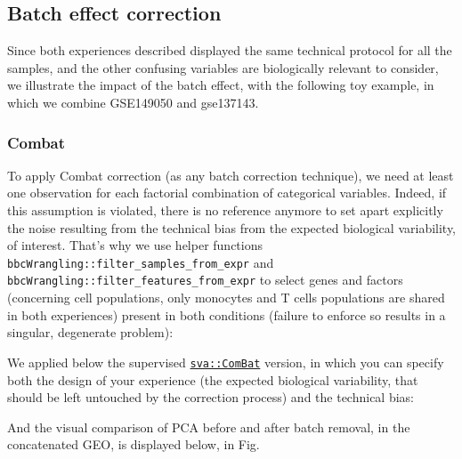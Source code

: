 \subsection{Batch effect correction} 
\label{batch-effect-correction}

Since both experiences described displayed the same technical protocol for all the samples, and the other confusing variables are biologically relevant to consider, we illustrate the impact of the batch effect, with the following toy example, in which we combine GSE149050 and gse137143.


\subsubsection{Combat} 
\label{combat}

To apply Combat correction (as any batch correction technique), we need at least one observation for each factorial combination of categorical variables. Indeed, if this assumption is violated, there is no reference anymore to set apart explicitly the noise resulting from the technical bias from the expected biological variability, of interest. That's why we use helper functions \texttt{bbcWrangling::filter\_samples\_from\_expr} and \texttt{bbcWrangling::filter\_features\_from\_expr} to select genes and factors (concerning cell populations, only monocytes and T cells populations are shared in both experiences) present in both conditions (failure to enforce so results in a singular, degenerate problem):

We applied below the supervised \href{https://rdrr.io/pkg/sva/man/ComBat.html}{\texttt{sva::ComBat}} \autocite{R-sva} version, in which you can specify both the design of your experience (the expected biological variability, that should be left untouched by the correction process) and the technical bias:

And the visual comparison of PCA before and after batch removal, in the concatenated GEO, is displayed below, in Fig. 


